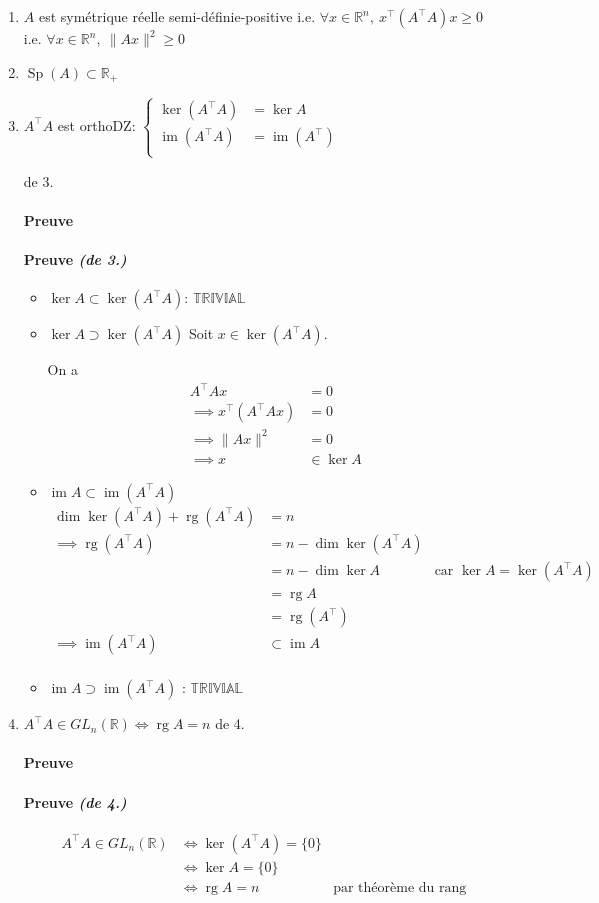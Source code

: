 \documentclass{article}
\newcommand{\trivial}{$\mathbb{TRIVIAL}$}
\newcommand{\image}{\operatorname{im}}
\newcommand{\rg}{\operatorname{rg}}
\newcommand{\dim}{\operatorname{dim}}
\newcommand{\R}{\mathbb{R}}
\newenvironment{proof}[1][\unskip]{
	\def\temp{#1}\ifx\temp\empty
		\paragraph{Preuve}
	\else
		\paragraph{Preuve \emph{(#1)}}
	\fi

}{}
\begin{document}
\begin{enumerate}
	\item $A$ est symétrique réelle semi-définie-positive i.e. $\forall x \in \R^n,\ x^\top (A^\top A)x \ge 0$ i.e. $\forall x\in \R^n,\ \|Ax\|^2\ge 0$
	\item $\operatorname{Sp}(A) \subset \R_+$
	\item $A^\top A$ est orthoDZ: $\begin{cases}
		\ker(A^\top A) &= \ker A \\
		\image(A^\top A) &= \image (A^\top) \\
	\end{cases}$

	\begin{proof}[de 3.]
		\begin{itemize}
			\item $\ker A \subset  \ker(A^\top A)$: \trivial
			\item $\ker A \supset \ker(A^\top A)$
			Soit $x\in \ker(A^\top A)$.

			On a \begin{align*}
				A^\top A x &= 0 \\
				\implies x^\top (A^\top A x) &= 0 \\
				\implies \|Ax\|^2 &= 0 \\
				\implies x &\in \ker A
			\end{align*}

			\item $\image A \subset  \image(A^\top A)$ 
				\begin{align*}
					\dim \ker (A^\top A) + \rg (A^\top A) &= n \\
					\implies \rg(A^\top A) &= n - \dim \ker(A^\top A) \\
					&= n - \dim \ker A \quad&\text{car $\ker A = \ker (A^\top A)$} \\
					&=  \rg A \\
					&= \rg (A^\top) \\
					\implies \image(A^\top A) &\subset   \image A \\
				\end{align*}
			\item $\image A \supset  \image(A^\top A)$ : \trivial
		\end{itemize}
	\end{proof}

	\item $A ^\top A \in GL_n(\R) \iff \rg A = n$
		\begin{proof}[de 4.]
		\begin{align*}
			A^\top A \in GL_n(\R) &\iff \ker(A^\top A) = \{0\}  \\
					      &\iff \ker A = \{0\} \\
					      &\iff \rg A = n \quad&\text{par théorème du rang}
		\end{align*}
	\end{proof}
\end{enumerate}
\end{document}
